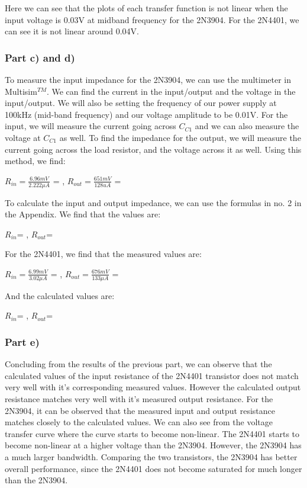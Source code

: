 \documentclass[12pt]{article}
\begin{document}
Here we can see that the plots of each transfer function is not linear when the input voltage is 0.03V at midband frequency for the 2N3904. For the 2N4401, we can see it is not linear around 0.04V. 

\subsubsection{Part c) and d)}


To measure the input impedance for the 2N3904, we can use the multimeter in Multisim$^{TM}$. We can find the current in the input/output and the voltage in the input/output. We will also be setting the frequency of our power supply at 100kHz (mid-band frequency) and our voltage amplitude to be 0.01V. For the input, we will measure the current going across $C_{C1}$ and we can also measure the voltage at $C_{C1}$ as well. To find the impedance for the output, we will measure the current going across the load resistor, and the voltage across it as well.  Using this method, we find:
\begin{center}
$R_{in}=\frac{6.96mV}{2.222\mu A}$ = , $R_{out}=\frac{651mV}{128u A}$ = 
\end{center}
To calculate the input and output impedance, we can use the formulas in no. 2 in the Appendix. We find that the values are:
\begin{center}
$R_{in}$= , $R_{out}$=    
\end{center}

For the 2N4401, we find that the measured values are:
\begin{center}
$R_{in}=\frac{6.99mV}{3.02\mu A}$ = , $R_{out}=\frac{676mV}{133\mu A}$ = 
\end{center}
And the calculated values are:
\begin{center}
$R_{in}$= , $R_{out}$=
\end{center}

\subsubsection{Part e)}
Concluding from the results of the previous part, we can observe that the calculated values of the input resistance of the 2N4401 transistor does not match very well with it's corresponding measured values. However the calculated output resistance matches very well with it's measured output resistance. For the 2N3904, it can be observed that the measured input and output resistance matches closely to the calculated values. We can also see from the voltage transfer curve where the curve starts to become non-linear. The 2N4401 starts to become non-linear at a higher voltage than the 2N3904. However, the 2N3904 has a much larger bandwidth. Comparing the two transistors, the 2N3904 has better overall performance, since the 2N4401 does not become saturated for much longer than the 2N3904.
\end{document}
